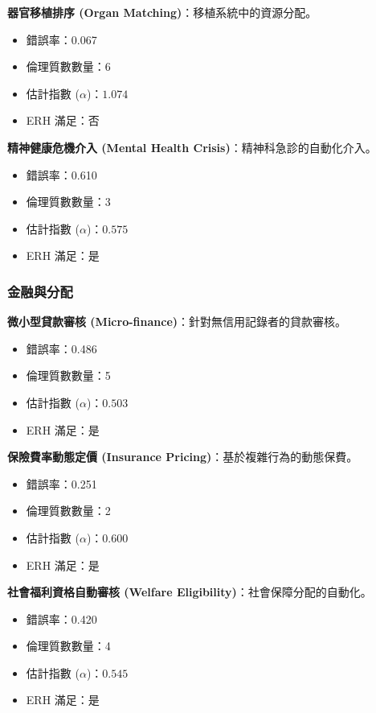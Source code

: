 \documentclass[12pt,a4paper]{article}
\theoremstyle{definition}
\theoremstyle{remark}
\begin{document}
\textbf{器官移植排序 (Organ Matching)}：移植系統中的資源分配。
\begin{itemize}
    \item 錯誤率：0.067
    \item 倫理質數數量：6
    \item 估計指數 ($\alpha$)：$1.074$
    \item ERH 滿足：否
\end{itemize}

\textbf{精神健康危機介入 (Mental Health Crisis)}：精神科急診的自動化介入。
\begin{itemize}
    \item 錯誤率：0.610
    \item 倫理質數數量：3
    \item 估計指數 ($\alpha$)：$0.575$
    \item ERH 滿足：是
\end{itemize}

\subsubsection{金融與分配}

\textbf{微小型貸款審核 (Micro-finance)}：針對無信用記錄者的貸款審核。
\begin{itemize}
    \item 錯誤率：0.486
    \item 倫理質數數量：5
    \item 估計指數 ($\alpha$)：$0.503$
    \item ERH 滿足：是
\end{itemize}

\textbf{保險費率動態定價 (Insurance Pricing)}：基於複雜行為的動態保費。
\begin{itemize}
    \item 錯誤率：0.251
    \item 倫理質數數量：2
    \item 估計指數 ($\alpha$)：$0.600$
    \item ERH 滿足：是
\end{itemize}

\textbf{社會福利資格自動審核 (Welfare Eligibility)}：社會保障分配的自動化。
\begin{itemize}
    \item 錯誤率：0.420
    \item 倫理質數數量：4
    \item 估計指數 ($\alpha$)：$0.545$
    \item ERH 滿足：是
\end{itemize}
\end{document}
